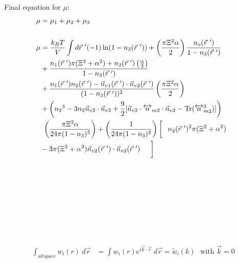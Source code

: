\documentclass[double,12pt]{beavtex}
\begin{document}
Final equation for $\mu$:  
\begin{align}
   \mu &=   \mu_1 + \mu_2 + \mu_3  \\ \nonumber \\
%
   \mu &=\frac{k_BT}{V}\int d\vec r~' (-1)\ln(1-n_3(\vec r~'))+\left(
        \frac{\pi\Xi^2\alpha}{2}\right)\frac{n_o(\vec r~')}
        {1-n_3(\vec r~')} \\
    &+ \frac{n_1(\vec r~')\pi(\Xi^2 + \alpha^2)
       +n_2(\vec r~')\left(\frac{\alpha}{2}\right)}{1-n_3(\vec r~')} \\
       &+ \frac{n_1(\vec r~')n_2(\vec r~')-\vec n_{v1}(\vec r~')
         \cdot \vec n_{v2}(\vec r~')}{(1-n_3(\vec r~'))^2}
          \left(\frac{\pi\Xi^2\alpha}{2}\right) \\
   &+\left({n_2}^3-3n_2
   \vec{n}_{v2}\cdot\vec{n}_{v2} 
    +\frac{9}{2}[\vec{n}_{v2}\cdot{\overleftrightarrow{n}_{m2}}\cdot{
    \vec{n}_{v2}}-\operatorname{Tr}({\overleftrightarrow{n}^3_{m2}})]
    \right) \\
    &~\left(\frac{\pi\Xi^2\alpha}{24\pi(1-n_3)^3}
    \right) + \left(\frac{1}{24\pi(1-n_3)^2}\right)\left[\color{white}
    \frac{1}{1}\color{black}n_2(\vec r~')^2
    \pi(\Xi^2 + \alpha^2) \color{white}\right] \\
    &- 3\pi(\Xi^2 + \alpha^2)\vec n_{v2}
    (\vec r~') \cdot \vec n_{v2}(\vec r~')
    \color{white}\left[\frac{1}{1}\color{black}\right]
\end{align}
\color{black}
\\
\\
\\
\\
\\
\\
\\
\\
\begin{align}
   \int_{all space} w_i(r) ~d\vec r &= \int w_i(r)e^{i\vec k \cdot 
   \vec r}~d\vec r 
    = \widetilde{w}_i(k) \mbox{~~with $\vec k = 0$}
\end{align}
\end{document}
